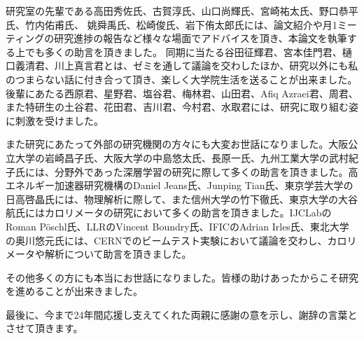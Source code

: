 研究室の先輩である高田秀佐氏、古賀淳氏、山口尚輝氏、宮崎祐太氏、野口恭平氏、竹内佑甫氏、 姚舜禹氏、松崎俊氏、岩下侑太郎氏には、論文紹介や月1ミーティングの研究進捗の報告など様々な場面でアドバイスを頂き、本論文を執筆する上でも多くの助言を頂きました。
同期に当たる谷田征輝君、宮本佳門君、樋口義清君、川上真言君とは、ゼミを通して議論を交わしたほか、研究以外にも私のつまらない話に付き合って頂き、楽しく大学院生活を送ることが出来ました。
後輩にあたる西原君、星野君、塩谷君、梅林君、山田君、Afiq Azraei君、周君、また特研生の土谷君、花田君、吉川君、今村君、水取君には、研究に取り組む姿に刺激を受けました。

また研究にあたって外部の研究機関の方々にも大変お世話になりました。大阪公立大学の岩崎昌子氏、大阪大学の中島悠太氏、長原一氏、九州工業大学の武村紀子氏には、分野外であった深層学習の研究に際して多くの助言を頂きました。高エネルギー加速器研究機構のDaniel Jeans氏、Junping Tian氏、東京学芸大学の日高啓晶氏には、物理解析に際して、また信州大学の竹下徹氏、東京大学の大谷航氏にはカロリメータの研究において多くの助言を頂きました。IJCLabのRoman P\"{o}schl氏、LLRのVincent Boundry氏、IFICのAdrian Irles氏、東北大学の奥川悠元氏には、CERNでのビームテスト実験において議論を交わし、カロリメータや解析について助言を頂きました。

その他多くの方にも本当にお世話になりました。皆様の助けあったからこそ研究を進めることが出来きました。

最後に、今まで24年間応援し支えてくれた両親に感謝の意を示し、謝辞の言葉とさせて頂きます。